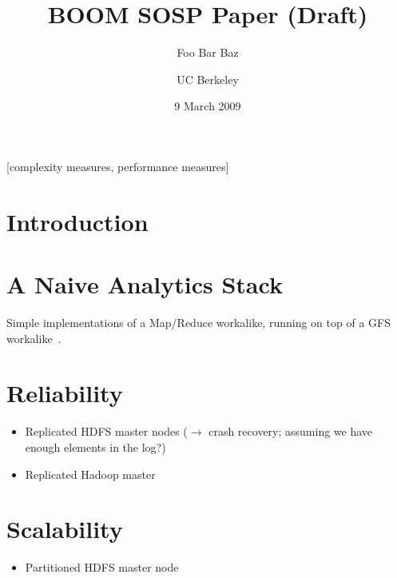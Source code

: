 \documentclass{sig-alternate}
\begin{document}

\title{BOOM SOSP Paper (Draft)}
\author{
\alignauthor
Foo
\alignauthor
Bar
\alignauthor
Baz
\and
UC Berkeley
}
\date{9 March 2009}

\maketitle
\begin{abstract}
\end{abstract}

[complexity measures, performance measures]


\section{Introduction}

\section{A Naive Analytics Stack}
Simple implementations of a Map/Reduce workalike, running on top of a
GFS workalike~\cite{gfs-sosp}.

\section{Reliability}
\begin{itemize}
\item
  Replicated HDFS master nodes ($\to$ crash recovery; assuming we have
  enough elements in the log?)

\item
  Replicated Hadoop master
\end{itemize}

\section{Scalability}
\begin{itemize}
\item
  Partitioned HDFS master node
\end{itemize}
\end{document}
